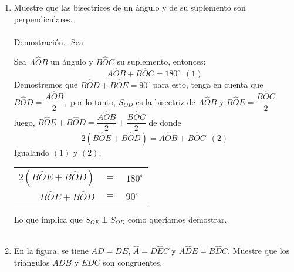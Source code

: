 \documentclass[10pt]{article}
\begin{document}
\begin{enumerate}
	\item Muestre que las bisectrices de un ángulo y de su suplemento son perpendiculares.\\\\
	Demostración.-\; Sea
	\begin{center}
	\end{center}

	Sea $A\widehat{O}B$ un ángulo y $B\widehat{O}C$ su suplemento, entonces: $$A\widehat{O}B + B\widehat{O}C = 180^{\circ}\,\,\, (1)$$
	Demostremos que $B\widehat{O}D + B\widehat{O}E = 90^{\circ}$ para esto, tenga en cuenta que $B\widehat{O}D = \dfrac{A\widehat{O}B}{2},$ por lo tanto, $S_{OD}$ es la bisectriz de $A\widehat{O}B$ y $B\widehat{O}E = \dfrac{B\widehat{O}C}{2}$ luego, $B\widehat{O}E + B\widehat{O}D = \dfrac{A\widehat{O}B}{2} + \dfrac{B\widehat{O}C}{2}$ de donde
	$$2(B\widehat{O}E + B\widehat{O}D) = A\widehat{O}B + B\widehat{O}C \,\,\, (2)$$ 
	Igualando $(1)$ y $(2)$, 
	\begin{center}
	    \begin{tabular}{rcl}
		$2(B\widehat{O}E + B\widehat{O}D)$ & $=$  & $180^{\circ}$\\
		$B\widehat{O}E + B\widehat{O}D$ & $=$ & $90^{\circ}$\\ 
	    \end{tabular}
	\end{center}

	Lo que implica que $S_{OE} \perp S_{OD}$ como queríamos demostrar.\\\\

	\item En la figura, se tiene $AD=DE$, $\widehat{A}=D\widehat{E}C$ y $A\widehat{D}E=B\widehat{D}C$. Muestre que los triángulos $ADB$ y $EDC$ son congruentes.
	
	\begin{center}
	\end{center}


\end{enumerate}
\end{document}
